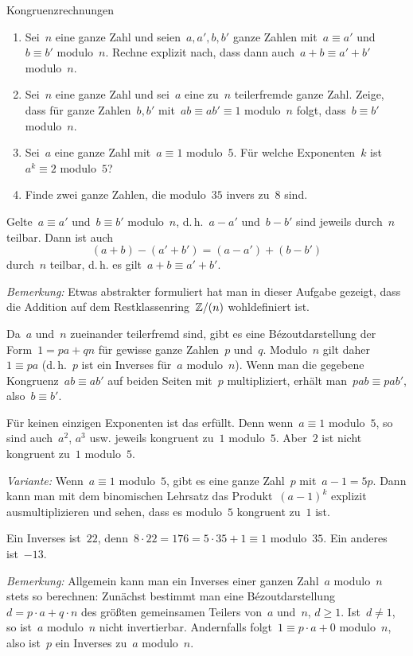\documentclass{algblatt}
\begin{document}
\begin{aufgabe}{Kongruenzrechnungen}
\begin{enumerate}
\item Sei~$n$ eine ganze Zahl und seien~$a,a', b,b'$ ganze Zahlen mit~$a \equiv
a'$ und~$b \equiv b'$ modulo~$n$. Rechne explizit nach, dass dann auch~$a+b
\equiv a'+b'$ modulo~$n$.
\item Sei~$n$ eine ganze Zahl und sei~$a$ eine zu~$n$ teilerfremde ganze Zahl.
Zeige, dass für ganze Zahlen~$b, b'$ mit~$a b \equiv a b' \equiv 1$ modulo~$n$
folgt, dass~$b \equiv b'$ modulo~$n$.
\item Sei~$a$ eine ganze Zahl mit~$a \equiv 1$ modulo~$5$. Für welche
Exponenten~$k$ ist~$a^k \equiv 2$ modulo~$5$?
\item Finde zwei ganze Zahlen, die modulo~$35$ invers zu~$8$ sind.
\end{enumerate}

\begin{loesungE}
\item Gelte~$a \equiv a'$ und~$b \equiv b'$ modulo~$n$, d.\,h.~$a - a'$ und~$b
- b'$ sind jeweils durch~$n$ teilbar. Dann ist auch
\[ (a+b) - (a'+b') = (a-a') + (b-b') \]
durch~$n$ teilbar, d.\,h. es gilt~$a+b \equiv a'+b'$.

\emph{Bemerkung:} Etwas abstrakter formuliert hat man in dieser Aufgabe
gezeigt, dass die Addition auf dem Restklassenring~$\mathbb{Z}/(n)$ wohldefiniert ist.

\item Da~$a$ und~$n$ zueinander teilerfremd sind, gibt es eine
Bézoutdarstellung der Form~$1 = pa + qn$ für gewisse ganze Zahlen~$p$ und~$q$.
Modulo~$n$ gilt daher~$1 \equiv p a$ (d.\,h.~$p$ ist ein Inverses für~$a$
modulo~$n$). Wenn man die gegebene Kongruenz~$ab \equiv ab'$ auf beiden Seiten
mit~$p$ multipliziert, erhält man~$pab \equiv pab'$, also~$b \equiv b'$.

\item Für keinen einzigen Exponenten ist das erfüllt. Denn wenn~$a \equiv 1$
modulo~$5$, so sind auch~$a^2$, $a^3$ usw. jeweils kongruent zu~$1$ modulo~$5$.
Aber~$2$ ist nicht kongruent zu~$1$ modulo~$5$.

\emph{Variante:} Wenn~$a \equiv 1$ modulo~$5$, gibt es eine ganze Zahl~$p$
mit~$a - 1 = 5p$. Dann kann man mit dem binomischen Lehrsatz das
Produkt~$(a-1)^k$ explizit ausmultiplizieren und sehen, dass es modulo~$5$
kongruent zu~$1$ ist.

\item Ein Inverses ist~$22$, denn~$8 \cdot 22 = 176 = 5 \cdot 35 + 1 \equiv 1$
modulo~$35$. Ein anderes ist~$-13$.

\emph{Bemerkung:} Allgemein kann man ein Inverses einer ganzen Zahl~$a$
modulo~$n$ stets so berechnen: Zunächst bestimmt man eine Bézoutdarstellung~$d
= p \cdot a + q \cdot n$ des größten gemeinsamen Teilers von~$a$ und~$n$, $d
\geq 1$. Ist~$d \neq 1$, so ist~$a$ modulo~$n$ nicht invertierbar. Andernfalls
folgt~$1 \equiv p \cdot a + 0$ modulo~$n$, also ist~$p$ ein Inverses zu~$a$
modulo~$n$.
\end{loesungE}
\end{aufgabe}
\end{document}
